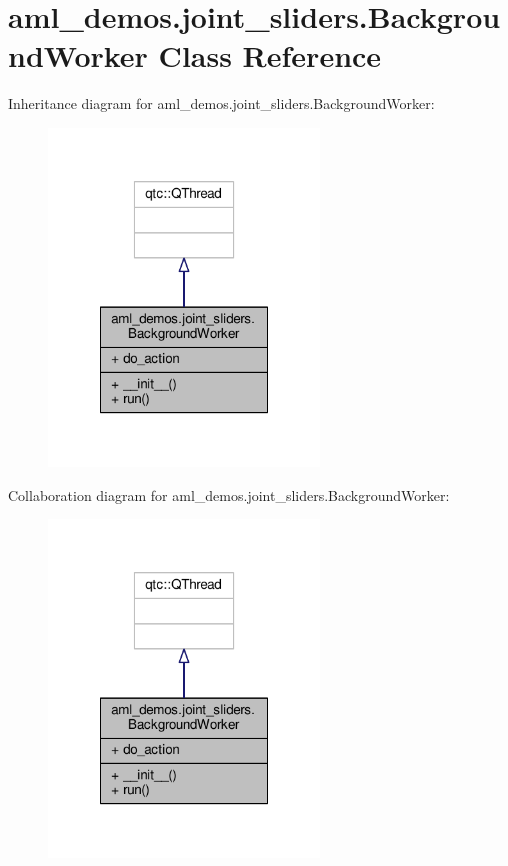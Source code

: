 \hypertarget{classaml__demos_1_1joint__sliders_1_1_background_worker}{\section{aml\-\_\-demos.\-joint\-\_\-sliders.\-Background\-Worker Class Reference}
\label{classaml__demos_1_1joint__sliders_1_1_background_worker}
}


Inheritance diagram for aml\-\_\-demos.\-joint\-\_\-sliders.\-Background\-Worker\-:
\nopagebreak
\begin{figure}[H]
\begin{center}
\leavevmode
\includegraphics[width=204pt]{classaml__demos_1_1joint__sliders_1_1_background_worker__inherit__graph}
\end{center}
\end{figure}


Collaboration diagram for aml\-\_\-demos.\-joint\-\_\-sliders.\-Background\-Worker\-:
\nopagebreak
\begin{figure}[H]
\begin{center}
\leavevmode
\includegraphics[width=204pt]{classaml__demos_1_1joint__sliders_1_1_background_worker__coll__graph}
\end{center}
\end{figure}
